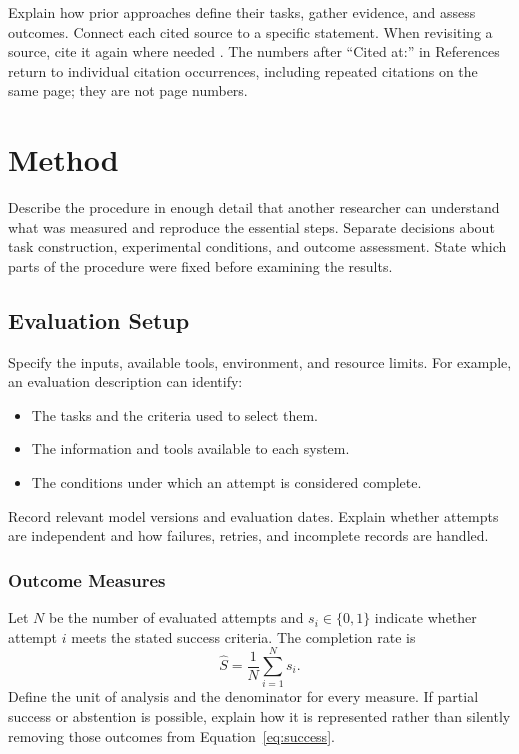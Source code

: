 \documentclass[11pt,a4paper]{article}
\begin{document}
Explain how prior approaches define their tasks, gather evidence, and assess
outcomes. Connect each cited source to a specific statement. When revisiting a
source, cite it again where needed \citep{hua2025charting}. The numbers after
``Cited at:'' in References return to individual citation occurrences, including
repeated citations on the same page; they are not page numbers.

\section{Method}
\label{sec:method}
Describe the procedure in enough detail that another researcher can understand
what was measured and reproduce the essential steps. Separate decisions about
task construction, experimental conditions, and outcome assessment. State which
parts of the procedure were fixed before examining the results.

\subsection{Evaluation Setup}
\label{sec:setup}
Specify the inputs, available tools, environment, and resource limits. For
example, an evaluation description can identify:
\begin{itemize}
  \item The tasks and the criteria used to select them.
  \item The information and tools available to each system.
  \item The conditions under which an attempt is considered complete.
\end{itemize}
Record relevant model versions and evaluation dates. Explain whether attempts
are independent and how failures, retries, and incomplete records are handled.

\subsubsection{Outcome Measures}
\label{sec:measures}
Let $N$ be the number of evaluated attempts and $s_i\in\{0,1\}$ indicate whether
attempt $i$ meets the stated success criteria. The completion rate is
\begin{equation}
  \widehat{S}=\frac{1}{N}\sum_{i=1}^{N}s_i.
  \label{eq:success}
\end{equation}
Define the unit of analysis and the denominator for every measure. If partial
success or abstention is possible, explain how it is represented rather than
silently removing those outcomes from Equation~\eqref{eq:success}.
\end{document}
